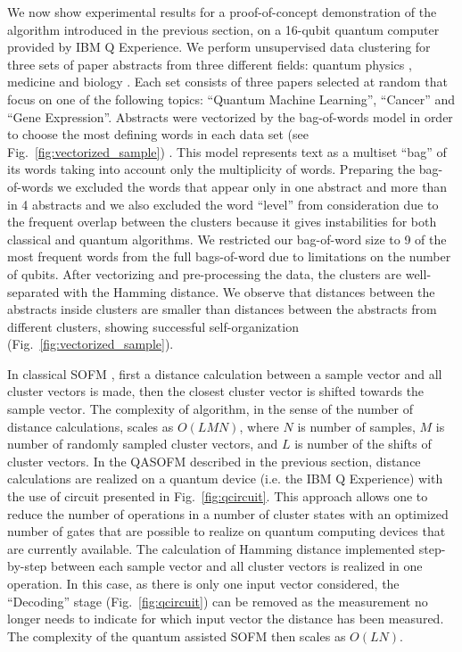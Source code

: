 \documentclass[pra,showkeys,twocolumn,showpacs]{revtex4-1}
\begin{document}
We now show experimental results for a proof-of-concept demonstration of the algorithm introduced in the previous section, on a 16-qubit quantum computer provided by IBM Q Experience.
We perform unsupervised data clustering for three sets of paper abstracts from three different fields:
quantum physics \cite{qml0, qml1, qml2},
medicine \cite{med0, med1, med2}
and biology \cite{bio0, bio1, bio2}.
Each set consists of three papers selected at random that focus on one of the following topics:
``Quantum Machine Learning'',
``Cancer''
and ``Gene Expression''.
Abstracts were vectorized by the bag-of-words \cite{weikang2016} model in order to choose the most defining words in each data set (see Fig.~\ref{fig:vectorized_sample}) \cite{mctear2016}.
This model represents text as a multiset ``bag'' of its words taking into account only the multiplicity of words.
Preparing the bag-of-words we excluded the words that appear only in one abstract and more than in 4 abstracts and we also excluded the word ``level'' from consideration due to the frequent overlap between the clusters because it gives instabilities for both classical and quantum algorithms.
We restricted our bag-of-word size to 9 of the most frequent words from the full bags-of-word  due to limitations on the number of qubits.
After vectorizing and pre-processing  the data, the clusters are well-separated with the Hamming distance.
We observe that distances between the abstracts inside clusters are smaller than distances between the abstracts from different clusters,
showing successful self-organization (Fig.~\ref{fig:vectorized_sample}).


In classical SOFM \cite{kohonen1990}, first a distance calculation between a sample vector and all cluster vectors is made,
then the closest cluster vector is shifted towards the sample vector.
The complexity of algorithm, in the sense of the number of distance calculations, scales as $O(LMN)$,
where $N$ is number of samples,
$M$ is number of randomly sampled cluster vectors,
and $L$ is number of the shifts of cluster vectors.
In the QASOFM described in the previous section, distance calculations are realized on a quantum device (i.e. the IBM Q Experience) with the use of circuit presented in Fig.~\ref{fig:qcircuit}. This approach allows one to reduce the number of operations in a number of cluster states with an optimized number of gates
that are possible to realize on  quantum computing devices that are currently available.
The calculation of Hamming distance implemented step-by-step between each sample vector and all cluster vectors is realized in one operation. In this case, as there is only one input vector considered, the ``Decoding'' stage (Fig.~\ref{fig:qcircuit}) can be removed as the measurement no longer needs to indicate for which input vector the distance has been measured.
The complexity of the quantum assisted SOFM then scales as $O(LN)$.
\end{document}

